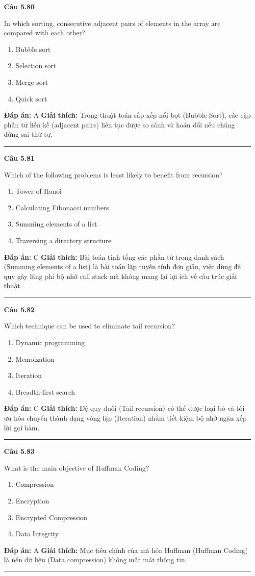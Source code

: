 \documentclass[11pt,a4paper]{article}
\newenvironment{question}[1]{%
  \par\vspace{1em}\noindent\textbf{\large Câu #1}\par\vspace{0.4em}
}{%
  \par\vspace{1em}\hrule\vspace{0.6em}
}
\newenvironment{choices}{%
  \begin{enumerate}[label=\textbf{\Alph*.},leftmargin=2.2em,itemsep=2pt,topsep=3pt]
}{%
  \end{enumerate}
}
\newcommand{\choice}{\item}
\begin{document}
\begin{question}{5.80}
In which sorting, consecutive adjacent pairs of elements in the array are compared with each other?
\begin{choices}
\choice Bubble sort
\choice Selection sort
\choice Merge sort
\choice Quick sort
\end{choices}
\textbf{Đáp án:} A
\textbf{Giải thích:} Trong thuật toán sắp xếp nổi bọt (Bubble Sort), các cặp phần tử liền kề (adjacent pairs) liên tục được so sánh và hoán đổi nếu chúng đứng sai thứ tự.
\end{question}

\begin{question}{5.81}
Which of the following problems is least likely to benefit from recursion?
\begin{choices}
\choice Tower of Hanoi
\choice Calculating Fibonacci numbers
\choice Summing elements of a list
\choice Traversing a directory structure
\end{choices}
\textbf{Đáp án:} C
\textbf{Giải thích:} Bài toán tính tổng các phần tử trong danh sách (Summing elements of a list) là bài toán lặp tuyến tính đơn giản, việc dùng đệ quy gây lãng phí bộ nhớ call stack mà không mang lại lợi ích về cấu trúc giải thuật.
\end{question}

\begin{question}{5.82}
Which technique can be used to eliminate tail recursion?
\begin{choices}
\choice Dynamic programming
\choice Memoization
\choice Iteration
\choice Breadth-first search
\end{choices}
\textbf{Đáp án:} C
\textbf{Giải thích:} Đệ quy đuôi (Tail recursion) có thể được loại bỏ và tối ưu hóa chuyển thành dạng vòng lặp (Iteration) nhằm tiết kiệm bộ nhớ ngăn xếp lời gọi hàm.
\end{question}

\begin{question}{5.83}
What is the main objective of Huffman Coding?
\begin{choices}
\choice Compression
\choice Encryption
\choice Encrypted Compression
\choice Data Integrity
\end{choices}
\textbf{Đáp án:} A
\textbf{Giải thích:} Mục tiêu chính của mã hóa Huffman (Huffman Coding) là nén dữ liệu (Data compression) không mất mát thông tin.
\end{question}
\end{document}
